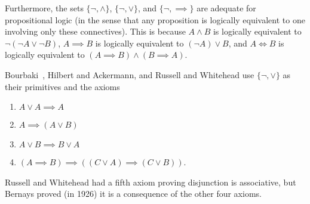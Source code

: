 \begin{node}[Semantics]
\begin{node}
Furthermore, the sets $\{\neg,\land\}$, $\{\neg,\lor\}$, and $\{\neg,\implies\}$
are adequate for propositional logic (in the sense that any proposition
is logically equivalent to one involving only these connectives). This
is because $A\land B$ is logically equivalent to $\neg(\neg A\lor\neg B)$,
$A\implies B$ is logically equivalent to $(\neg A)\lor B$, and $A\iff B$
is logically equivalent to $(A\implies B)\land(B\implies A)$.

\begin{node}\label{prop:semantics-0004}%
Bourbaki~\cite{bourbaki1968theory}, Hilbert and Ackermann, and Russell
and Whitehead use $\{\neg,\lor\}$ as their primitives and the axioms
\begin{enumerate}
\item $A\lor A\implies A$
\item $A\implies(A\lor B)$
\item $A\lor B\implies B\lor A$
\item $(A\implies B)\implies((C\lor A)\implies(C\lor B))$.
\end{enumerate}
Russell and Whitehead had a fifth axiom proving disjunction is
associative, but Bernays proved (in 1926) it is a consequence of the
other four axioms. 
\end{node}
\end{node}
\end{node}
